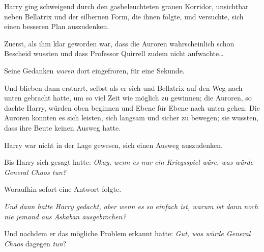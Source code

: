 \later

Harry ging schweigend durch den gasbeleuchteten grauen Korridor, unsichtbar neben Bellatrix und der silbernen Form, die ihnen folgte, und versuchte, sich einen besseren Plan auszudenken.

Zuerst, als ihm klar geworden war, dass die Auroren wahrscheinlich schon Bescheid wussten und dass Professor Quirrell zudem nicht aufwachte…

Seine Gedanken \emph{waren} dort eingefroren, für eine Sekunde.

Und blieben dann erstarrt, selbst als er sich und Bellatrix auf den Weg nach unten gebracht hatte, um so viel Zeit wie möglich zu gewinnen; die Auroren, so dachte Harry, würden oben beginnen und Ebene für Ebene nach unten gehen. Die Auroren konnten es sich leisten, sich langsam und sicher zu bewegen; sie wussten, dass ihre Beute keinen Ausweg hatte.

Harry war nicht in der Lage gewesen, sich einen Ausweg auszudenken.

Bis Harry sich gesagt hatte: \emph{Okay, wenn es nur ein Kriegsspiel wäre, was würde General Chaos tun?}

Woraufhin sofort eine Antwort folgte.

\emph{Und dann hatte Harry gedacht, \emph{aber wenn es} so \emph{einfach ist, warum ist} \emph{dann} \emph{noch nie jemand aus Askaban ausgebrochen?}}

Und nachdem er das mögliche Problem erkannt hatte: \emph{Gut, was würde General Chaos} dagegen \emph{tun}?

